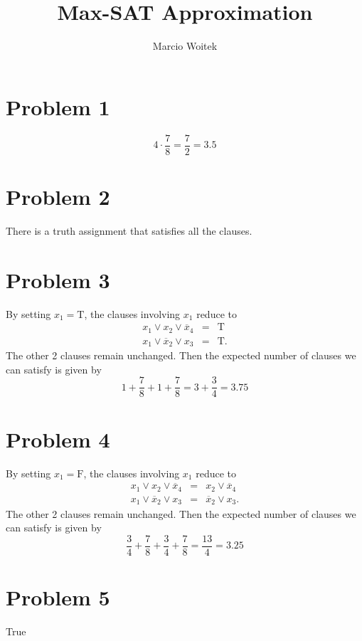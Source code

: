 \documentclass[11pt]{article}
\author{Marcio Woitek}
\date{}
\title{Max-SAT Approximation}
\begin{document}
\maketitle

\section*{Problem 1}
\label{sec:orgffad40c}
\begin{equation}
4 \cdot \frac{7}{8} = \frac{7}{2} = 3.5
\end{equation}

\section*{Problem 2}
\label{sec:orgd521fc5}
There is a truth assignment that satisfies all the clauses.

\section*{Problem 3}
\label{sec:orgd9b2d24}
By setting \(x_1 = \mathrm{T}\), the clauses involving \(x_1\) reduce to
\begin{eqnarray*}
x_1 \vee x_2 \vee \overline{x}_4 &=& \mathrm{T} \\
x_1 \vee \overline{x}_2 \vee x_3 &=& \mathrm{T}.
\end{eqnarray*}
The other 2 clauses remain unchanged. Then the expected number of clauses we can
satisfy is given by
\begin{equation}
1 + \frac{7}{8} + 1 + \frac{7}{8} = 3 + \frac{3}{4} = 3.75
\end{equation}

\section*{Problem 4}
\label{sec:org8e27c71}
By setting \(x_1 = \mathrm{F}\), the clauses involving \(x_1\) reduce to
\begin{eqnarray*}
x_1 \vee x_2 \vee \overline{x}_4 &=& x_2 \vee \overline{x}_4 \\
x_1 \vee \overline{x}_2 \vee x_3 &=& \overline{x}_2 \vee x_3.
\end{eqnarray*}
The other 2 clauses remain unchanged. Then the expected number of clauses we can
satisfy is given by
\begin{equation}
\frac{3}{4} + \frac{7}{8} + \frac{3}{4} + \frac{7}{8} = \frac{13}{4} = 3.25
\end{equation}

\section*{Problem 5}
\label{sec:org0249b24}
True
\end{document}
